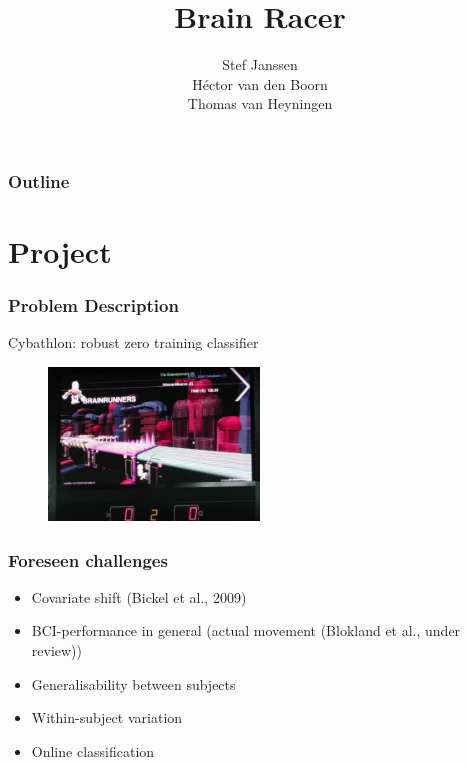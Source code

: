 \documentclass{beamer}
\title[Brain Racer]{
  Brain Racer}
\author[Stef, H\'ector, Thomas]{Stef Janssen\\H\'ector van den Boorn\\Thomas van Heyningen }
\begin{document}
\begin{frame}
  \titlepage
\end{frame}

\begin{frame}
  \frametitle{Outline}
  \tableofcontents
\end{frame}



\section{Project}
\begin{frame}
  \frametitle{Problem Description}

  Cybathlon: robust zero training classifier


  \begin{figure}
   
    \includegraphics[width=0.5\textwidth]{cybathlon_challenge.png}
  \end{figure}
  
\end{frame}

\begin{frame}
  \frametitle{Foreseen challenges}

  \begin{itemize}
    \item Covariate shift (Bickel et al., 2009)
    \item BCI-performance in general (actual movement (Blokland et al., under review))
    \item Generalisability between subjects
    \item Within-subject variation
    \item Online classification
  \end{itemize}
\end{frame}
\end{document}
